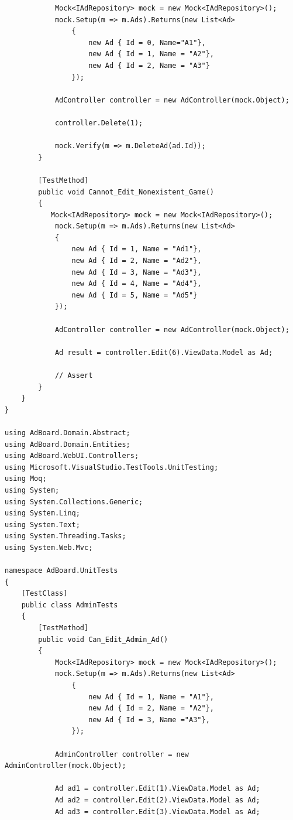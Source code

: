 \documentclass[14pt,a4paper]{extreport}
\begin{document}
\begin{lstlisting}
            Mock<IAdRepository> mock = new Mock<IAdRepository>();
            mock.Setup(m => m.Ads).Returns(new List<Ad>
                {
                    new Ad { Id = 0, Name="A1"},
                    new Ad { Id = 1, Name = "A2"},
                    new Ad { Id = 2, Name = "A3"}
                });

            AdController controller = new AdController(mock.Object);

            controller.Delete(1);            

            mock.Verify(m => m.DeleteAd(ad.Id));
        }

        [TestMethod]
        public void Cannot_Edit_Nonexistent_Game()
        {
           Mock<IAdRepository> mock = new Mock<IAdRepository>();
            mock.Setup(m => m.Ads).Returns(new List<Ad>
            {
                new Ad { Id = 1, Name = "Ad1"},
                new Ad { Id = 2, Name = "Ad2"},
                new Ad { Id = 3, Name = "Ad3"},
                new Ad { Id = 4, Name = "Ad4"},
                new Ad { Id = 5, Name = "Ad5"}
            });

            AdController controller = new AdController(mock.Object);

            Ad result = controller.Edit(6).ViewData.Model as Ad;

            // Assert
        }         
    }
}

using AdBoard.Domain.Abstract;
using AdBoard.Domain.Entities;
using AdBoard.WebUI.Controllers;
using Microsoft.VisualStudio.TestTools.UnitTesting;
using Moq;
using System;
using System.Collections.Generic;
using System.Linq;
using System.Text;
using System.Threading.Tasks;
using System.Web.Mvc;

namespace AdBoard.UnitTests
{
    [TestClass]
    public class AdminTests
    {
        [TestMethod]
        public void Can_Edit_Admin_Ad()
        {
            Mock<IAdRepository> mock = new Mock<IAdRepository>();
            mock.Setup(m => m.Ads).Returns(new List<Ad>
                {
                    new Ad { Id = 1, Name = "A1"},
                    new Ad { Id = 2, Name = "A2"},
                    new Ad { Id = 3, Name ="A3"},
                });

            AdminController controller = new AdminController(mock.Object);

            Ad ad1 = controller.Edit(1).ViewData.Model as Ad;
            Ad ad2 = controller.Edit(2).ViewData.Model as Ad;
            Ad ad3 = controller.Edit(3).ViewData.Model as Ad;


\end{lstlisting}
\end{document}
